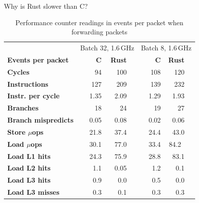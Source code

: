 \documentclass[NET,english,aspectratio=169,notitleframe]{tumbeamer}
\begin{document}
\begin{frame}{Why is Rust slower than C?}
\begin{table}[t]
 \setlength{\tabcolsep}{1.1mm}
	\centering
	\footnotesize
	\begin{tabular}{lrrrrrrrr}
		& \multicolumn{4}{c}{Batch 32, 1.6\,GHz} & \multicolumn{4}{c}{Batch 8, 1.6\,GHz} \\
		\textbf{Events per packet} & \hspace{1em} & \textbf{C} & \textbf{Rust} & \hspace{2.5em} & & \textbf{C} & \textbf{Rust} & \hspace{1.5em} \\
		\toprule
		\textbf{Cycles}                     & & 94 & 100     &&& 108 &  120 \\
		\textbf{Instructions}              & & 127 & 209   &&& 139 &  232  \\
		\textbf{Instr. per cycle}         & & 1.35 & 2.09 &&& 1.29 & 1.93 &  \vspace{0.35em}  \\
		\textbf{Branches}                 & & 18 & 24      &&& 19 &  27  \\
		\textbf{Branch mispredicts} & & 0.05 & 0.08       &&& 0.02 & 0.06 & 		\vspace{0.35em} \\
		\textbf{Store $\mu$ops}       & & 21.8 & 37.4      &&& 24.4 & 43.0  \\
		\textbf{Load $\mu$ops}       & & 30.1 & 77.0      &&& 33.4 & 84.2\  \\
		\textbf{Load L1 hits}                     & & 24.3 & 75.9      &&& 28.8 & 83.1 \\
		\textbf{Load L2 hits}                     & & 1.1 & 0.05         &&& 1.2 & 0.1 \\
		\textbf{Load L3 hits}                     & & 0.9 & 0.0      &&& 0.5 & 0.0 \\
		\textbf{Load L3 misses}               & & 0.3 & 0.1         &&& 0.3 & 0.3 \\
		\bottomrule
	\end{tabular}
	\caption{Performance counter readings in events per packet when forwarding packets}
	\label{tbl:rust-profiling}
	\vspace{-3em}
\end{table}
\end{frame}
\end{document}
